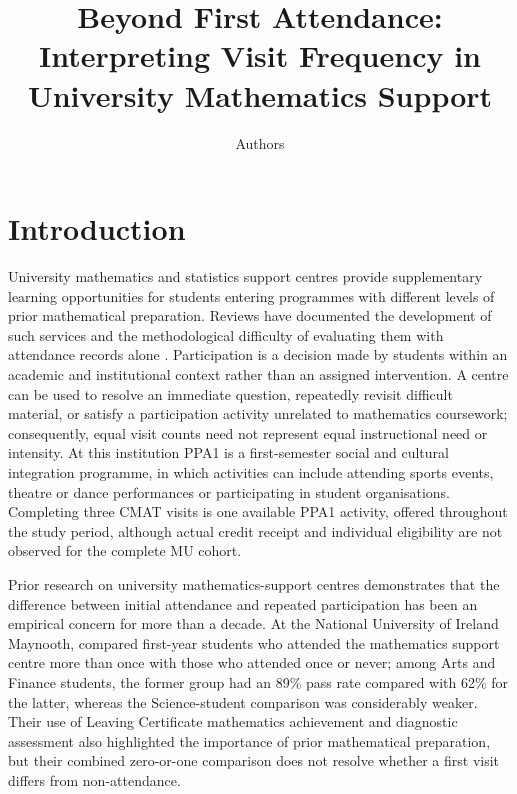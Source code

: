 \documentclass[namedate,webpdf,imaiai]{ima-authoring-template}
\title[Beyond first attendance]{Beyond First Attendance: Interpreting Visit Frequency in University Mathematics Support}
\author{Authors
\address{Universidad de las Am\'ericas Puebla}}
\begin{document}
\maketitle

\section{Introduction}

University mathematics and statistics support centres provide supplementary learning opportunities for students entering programmes with different levels of prior mathematical preparation. Reviews have documented the development of such services and the methodological difficulty of evaluating them with attendance records alone \citep{matthews2013,lawson2020,mullen2024}. Participation is a decision made by students within an academic and institutional context rather than an assigned intervention. A centre can be used to resolve an immediate question, repeatedly revisit difficult material, or satisfy a participation activity unrelated to mathematics coursework; consequently, equal visit counts need not represent equal instructional need or intensity. At this institution PPA1 is a first-semester social and cultural integration programme, in which activities can include attending sports events, theatre or dance performances or participating in student organisations. Completing three CMAT visits is one available PPA1 activity, offered throughout the study period, although actual credit receipt and individual eligibility are not observed for the complete MU cohort.

Prior research on university mathematics-support centres demonstrates that the difference between initial attendance and repeated participation has been an empirical concern for more than a decade. At the National University of Ireland Maynooth, \citet{macanbhaird2009} compared first-year students who attended the mathematics support centre more than once with those who attended once or never; among Arts and Finance students, the former group had an 89\% pass rate compared with 62\% for the latter, whereas the Science-student comparison was considerably weaker. Their use of Leaving Certificate mathematics achievement and diagnostic assessment also highlighted the importance of prior mathematical preparation, but their combined zero-or-one comparison does not resolve whether a first visit differs from non-attendance.
\end{document}
